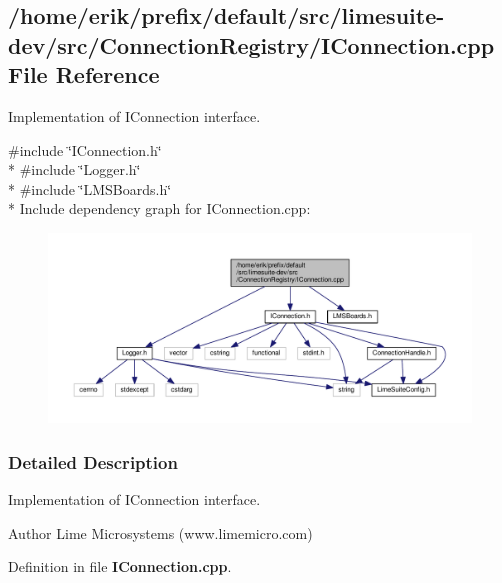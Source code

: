 \subsection{/home/erik/prefix/default/src/limesuite-\/dev/src/\+Connection\+Registry/\+I\+Connection.cpp File Reference}
\label{IConnection_8cpp}


Implementation of I\+Connection interface.  


{\ttfamily \#include \char`\"{}I\+Connection.\+h\char`\"{}}\\*
{\ttfamily \#include \char`\"{}Logger.\+h\char`\"{}}\\*
{\ttfamily \#include \char`\"{}L\+M\+S\+Boards.\+h\char`\"{}}\\*
Include dependency graph for I\+Connection.\+cpp\+:
\nopagebreak
\begin{figure}[H]
\begin{center}
\leavevmode
\includegraphics[width=350pt]{d0/ddd/IConnection_8cpp__incl}
\end{center}
\end{figure}


\subsubsection{Detailed Description}
Implementation of I\+Connection interface. 

\begin{DoxyAuthor}{Author}
Lime Microsystems (www.\+limemicro.\+com) 
\end{DoxyAuthor}


Definition in file {\bf I\+Connection.\+cpp}.

